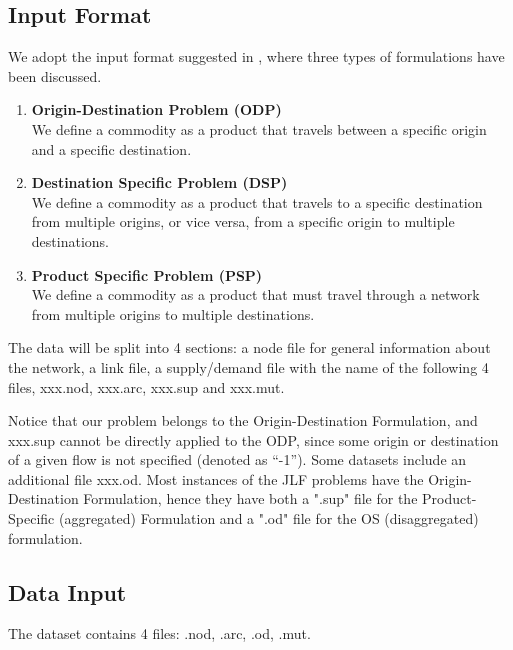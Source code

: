 \subsection{Input Format}
We adopt the input format suggested in \cite{Jones1993MulticommodityNF}, where three types of formulations have been discussed. 
\begin{enumerate}
    \item \textbf{Origin-Destination Problem (ODP)}\\We define a commodity as a product that
travels between a specific origin and a specific destination.
\item \textbf{Destination Specific Problem (DSP)} \\
We define a
commodity as a product that travels to a specific destination from multiple origins, or vice
versa, from a specific origin to multiple destinations.
\item \textbf{Product Specific Problem (PSP)}\\
We define a commodity as a product that
must travel through a network from multiple origins to multiple destinations.

\end{enumerate}

The data will be split into 4 sections: a node file
for general information about the network, a link file, a supply/demand file with the name of the following 4 files, xxx.nod, xxx.arc, xxx.sup and xxx.mut. 

Notice that our problem belongs to the Origin-Destination Formulation, and xxx.sup cannot be directly applied to the ODP, since some origin or destination of a given flow is not specified (denoted as ``-1'').  Some datasets include an additional file xxx.od. Most instances of the JLF problems \cite{Jones1993MulticommodityNF} have the Origin-Destination Formulation, hence they have both a ".sup" file for the Product-Specific (aggregated) Formulation and a ".od" file for the OS (disaggregated) formulation.

\subsection{Data Input}
The dataset contains 4 files: .nod, .arc, .od, .mut.


